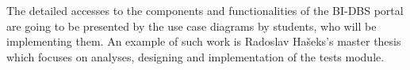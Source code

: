 \noindent The detailed accesses to the components and functionalities of the BI-DBS portal are going to be presented by the use case diagrams by students, who will be implementing them. An example of such work is Radoslav Hašeks's master thesis\cite{mt-hasek} which focuses on analyses, designing and implementation of the tests module.